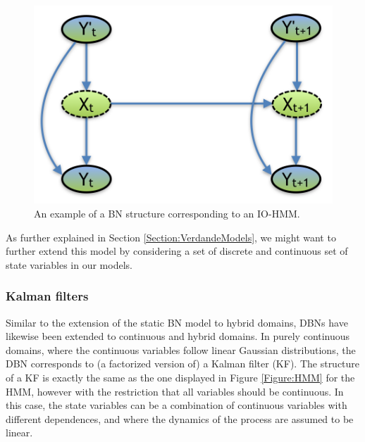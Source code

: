 \begin{figure}[ht!]
\begin{center}
\includegraphics[scale=0.4]{./figures/preliminariesIO-HMM}
\caption{\label{Figure:IO-HMM}An example of a BN structure corresponding to an IO-HMM.}
\end{center}
\end{figure}

As further explained in Section \ref{Section:VerdandeModels}, we might want to further extend this model by considering a set of discrete and continuous set of state variables in our models. 

\subsubsection{Kalman filters}\label{SubSubSection:KFs}

Similar to the extension of the static BN model to hybrid domains, DBNs have likewise been extended to continuous and hybrid domains. In purely continuous domains, where the continuous variables follow linear Gaussian distributions, the DBN corresponds to (a factorized version of) a Kalman filter (KF). The structure of a KF is exactly the same as the one displayed in Figure \ref{Figure:HMM} for the HMM, however with the restriction that all variables should be continuous. In this case, the state variables can be a combination of continuous variables with different dependences, and where the dynamics of the process are assumed to be linear. 

